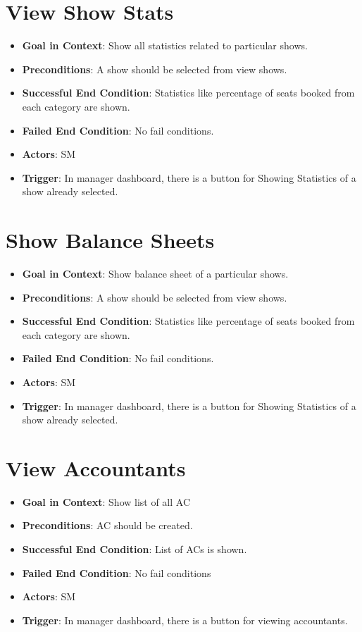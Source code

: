 \documentclass{scrreprt}
\begin{document}
\section{View Show Stats}
\begin{itemize}
\item \textbf{Goal in Context}: Show all statistics related to particular shows.
\item \textbf{Preconditions}: A show should be selected from view shows.
\item \textbf{Successful End Condition}: Statistics like percentage of seats booked from each category are shown.
\item \textbf{Failed End Condition}: No fail conditions.
\item \textbf{Actors}: SM
\item \textbf{Trigger}: In manager dashboard, there is a button for Showing Statistics of a show already selected.
\end{itemize}

\section{Show Balance Sheets}
\begin{itemize}
\item \textbf{Goal in Context}: Show balance sheet of a particular shows.
\item \textbf{Preconditions}: A show should be selected from view shows.
\item \textbf{Successful End Condition}: Statistics like percentage of seats booked from each category are shown.
\item \textbf{Failed End Condition}: No fail conditions.
\item \textbf{Actors}: SM
\item \textbf{Trigger}: In manager dashboard, there is a button for Showing Statistics of a show already selected.
\end{itemize}


\section{View Accountants}
\begin{itemize}
\item \textbf{Goal in Context}: Show list of all AC
\item \textbf{Preconditions}: AC should be created.
\item \textbf{Successful End Condition}: List of ACs is shown.
\item \textbf{Failed End Condition}: No fail conditions
\item \textbf{Actors}: SM
\item \textbf{Trigger}: In manager dashboard, there is a button for viewing accountants.
\end{itemize}
\end{document}
